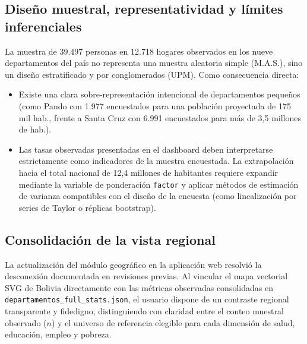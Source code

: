 \subsection{Diseño muestral, representatividad y límites inferenciales}
La muestra de 39.497 personas en 12.718 hogares observados en los nueve departamentos del país no representa una muestra aleatoria simple (M.A.S.), sino un diseño estratificado y por conglomerados (UPM). Como consecuencia directa:
\begin{itemize}[leftmargin=0.5in]
  \item Existe una clara sobre-representación intencional de departamentos pequeños (como Pando con 1.977 encuestados para una población proyectada de 175 mil hab., frente a Santa Cruz con 6.991 encuestados para más de 3,5 millones de hab.).
  \item Las tasas observadas presentadas en el dashboard deben interpretarse estrictamente como indicadores de la muestra encuestada. La extrapolación hacia el total nacional de 12,4 millones de habitantes requiere expandir mediante la variable de ponderación \texttt{factor} y aplicar métodos de estimación de varianza compatibles con el diseño de la encuesta (como linealización por series de Taylor o réplicas bootstrap).
\end{itemize}

\subsection{Consolidación de la vista regional}
La actualización del módulo geográfico en la aplicación web resolvió la desconexión documentada en revisiones previas. Al vincular el mapa vectorial SVG de Bolivia directamente con las métricas observadas consolidadas en \texttt{departamentos\_full\_stats.json}, el usuario dispone de un contraste regional transparente y fidedigno, distinguiendo con claridad entre el conteo muestral observado ($n$) y el universo de referencia elegible para cada dimensión de salud, educación, empleo y pobreza.
